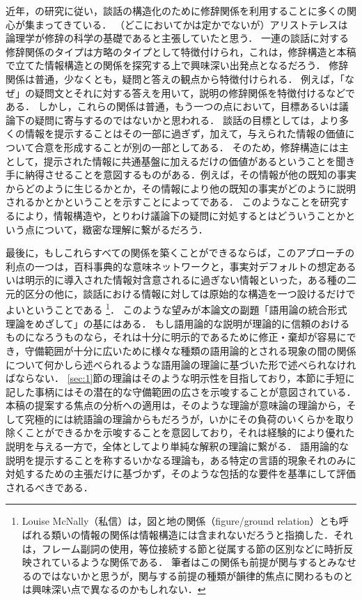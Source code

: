 \documentclass{goken}
\newcommand{\term}[2]{\textsf{#1}（#2）}
\newcommand{\ori}[1]{\noindent\textcolor[gray]{0.7}{\fontsize{8pt}{8pt}\selectfont{\textsf{(p.~#1)}}} }
\begin{document}
近年，\citet{MannThompson1987}の研究に従い，談話の構造化のために修辞関係を利用することに多くの関心が集まってきている．
（どこにおいてかは定かでないが）アリストテレスは論理学が修辞の科学の基礎であると主張していたと思う．
一連の談話に対する修辞関係のタイプは方略のタイプとして特徴付けられ，これは，修辞構造と本稿で立てた情報構造との関係を探究する上で興味深い出発点となるだろう．
\ori{63}
修辞関係は普通，少なくとも，疑問と答えの観点から特徴付けられる．
例えば，「なぜ」の疑問文とそれに対する答えを用いて，説明の修辞関係を特徴付けるなどである．
しかし，これらの関係は普通，もう一つの点において，目標あるいは議論下の疑問に寄与するのではないかと思われる．
談話の目標としては，より多くの情報を提示することはその一部に過ぎず，加えて，与えられた情報の価値について合意を形成することが別の一部としてある．
そのため，修辞構造には主として，提示された情報に共通基盤に加えるだけの価値があるということを聞き手に納得させることを意図するものがある．例えば，その情報が他の既知の事実からどのように生じるかとか，その情報により他の既知の事実がどのように説明されるかとかということを示すことによってである．
このようなことを研究するにより，情報構造や，とりわけ議論下の疑問に対処するとはどういうことかという点について，緻密な理解に繋がるだろう．

最後に，もしこれらすべての関係を築くことができるならば，このアプローチの利点の一つは，百科事典的な意味ネットワークと，事実対デフォルトの想定あるいは明示的に導入された情報対含意されるに過ぎない情報といった，ある種の二元的区分の他に，談話における情報に対しては原始的な構造を一つ設けるだけでよいということである
\footnote{%
	Louise McNally（私信）は，\term{図と地の関係}{figure/ground relation}とも呼ばれる類いの情報の関係は情報構造には含まれないだろうと指摘した．それは，フレーム副詞の使用，等位接続する節と従属する節の区別などに時折反映されているような関係である．
  筆者はこの関係も前提が関与するとみなせるのではないかと思うが，関与する前提の種類が韻律的焦点に関わるものとは興味深い点で異なるのかもしれない．
}．
このような望みが本論文の副題「語用論の統合形式理論をめざして」の基にはある．
もし語用論的な説明が理論的に信頼のおけるものになろうものなら，それは十分に明示的であるために修正・棄却が容易にでき，守備範囲が十分に広いために様々な種類の語用論的とされる現象の間の関係について何かしら述べられるような語用論の理論に基づいた形で述べられなければならない．
\ref{sec:1}節の理論はそのような明示性を目指しており，本節に手短に記した事柄にはその潜在的な守備範囲の広さを示唆することが意図されている．
本稿の提案する焦点の分析への適用は，そのような理論が意味論の理論から，そして究極的には統語論の理論からもだろうが，いかにその負荷のいくらかを取り除くことができるかを示唆することを意図しており，それは経験的により優れた説明を与える一方で，全体としてより単純な解釈の理論に繋がる．
語用論的な説明を提示することを称するいかなる理論も，ある特定の言語的現象それのみに対処するための主張だけに基づかず，そのような包括的な要件を基準にして評価されるべきである．
\end{document}
